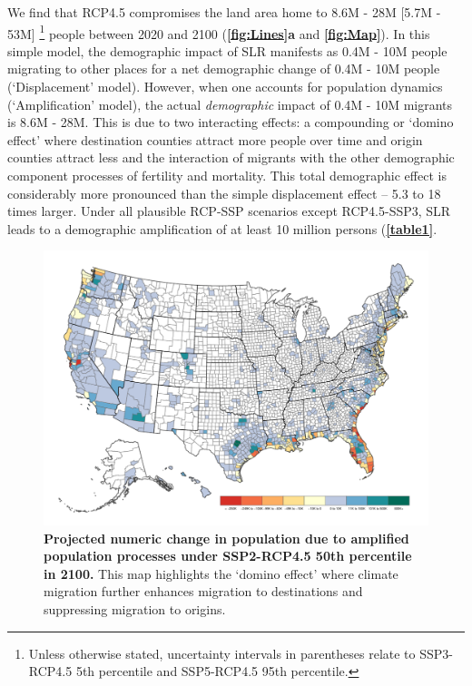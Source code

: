 \documentclass[12pt]{article}
\begin{document}
We find that RCP4.5 compromises the land area home to 8.6M - 28M {[}5.7M
- 53M{]}
\footnote{Unless otherwise stated, uncertainty intervals in parentheses relate to SSP3-RCP4.5 5th percentile and SSP5-RCP4.5 95th percentile.}
people between 2020 and 2100 (\textbf{\autoref{fig:Lines}a} and
\textbf{\autoref{fig:Map}}). In this simple model, the demographic
impact of SLR manifests as 0.4M - 10M people migrating to other places
for a net demographic change of 0.4M - 10M people (`Displacement'
model). However, when one accounts for population dynamics
(`Amplification' model), the actual \textit{demographic} impact of 0.4M
- 10M migrants is 8.6M - 28M. This is due to two interacting effects: a
compounding or `domino effect' where destination counties attract more
people over time and origin counties attract less and the interaction of
migrants with the other demographic component processes of fertility and
mortality. This total demographic effect is considerably more pronounced
than the simple displacement effect -- 5.3 to 18 times larger. Under all
plausible RCP-SSP scenarios except RCP4.5-SSP3, SLR leads to a
demographic amplification of at least 10 million persons
(\textbf{\autoref{table1}}.

\begin{figure}
\includegraphics[width=1\linewidth]{FigMedAgeMap3} \caption{\textbf{Projected numeric change in population due to amplified population processes under SSP2-RCP4.5 50th percentile in 2100.} This map highlights the `domino effect' where climate migration further enhances migration to destinations and suppressing migration to origins. \label{fig:Map}}\label{fig:figmap}
\end{figure}
\end{document}

